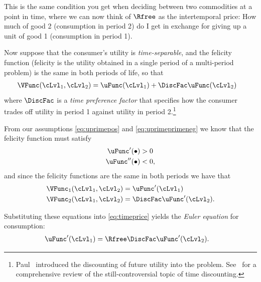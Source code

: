 \documentclass{scrartcl}
\begin{document}
  This is the same condition you get when deciding between two commodities at a point in time, where we can now think of $\Rfree$ as the intertemporal price: How much of good 2 (consumption in period 2) do I get in exchange for giving up a unit of good 1 (consumption in period 1).

  Now suppose that the consumer's utility is \textit{time-separable}, and the felicity function (felicity is the utility obtained in a single period of a multi-period problem) is the same in both periods of life, so that
  \begin{equation}\begin{gathered}\begin{aligned} \VFunc(\cLvl_{1},\cLvl_{2}) & = \uFunc(\cLvl_{1})+\DiscFac \uFunc(\cLvl_{2})
      \end{aligned}\end{gathered}\end{equation} where $\DiscFac$ is a \textit{time preference factor} that specifies how the consumer trades off utility in period 1 against utility in period 2.\footnote{Paul~\cite{samuelson1937note,samuelsonOLG} introduced the discounting of future utility into the problem.
    See~\cite{floDiscounting} for a comprehensive review of the still-controversial topic of time discounting.}

  From our assumptions \eqref{eq:uprimepos} and \eqref{eq:uprimeprimeneg} we know that the felicity function must satisfy
  \begin{equation}\begin{gathered}\begin{aligned} \uFunc^{\prime}(\bullet) & > 0 \\ \uFunc^{\prime\prime}(\bullet) & < 0,
      \end{aligned}\end{gathered}\end{equation} and since the felicity functions are the same in both periods we have that
  \begin{equation}\begin{gathered}\begin{aligned} \VFunc_{1}(\cLvl_{1},\cLvl_{2}) & = \uFunc^{\prime}(\cLvl_{1}) \\ \VFunc_{2}(\cLvl_{1},\cLvl_{2}) & = \DiscFac \uFunc^{\prime}(\cLvl_{2}).
      \end{aligned}\end{gathered}\end{equation}

  Substituting these equations into \eqref{eq:timeprice} yields the \textit{Euler equation} for consumption:
  \begin{equation}\begin{gathered}\begin{aligned} \uFunc^{\prime}(\cLvl_{1}) & = \Rfree \DiscFac \uFunc^{\prime}(\cLvl_{2}). \label{eq:euler}
      \end{aligned}\end{gathered}\end{equation}
\end{document}
